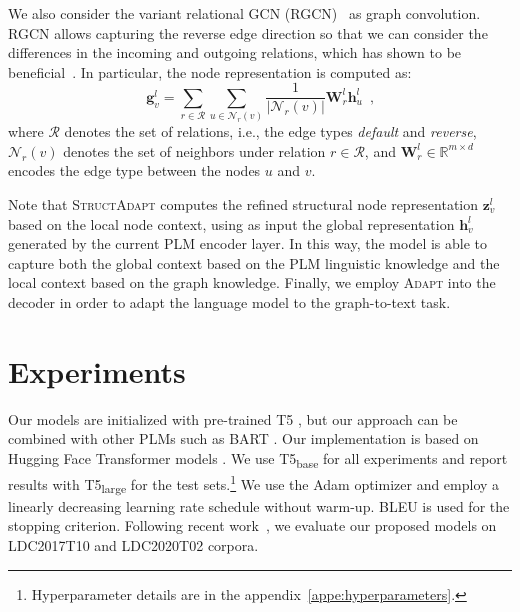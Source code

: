 \documentclass[11pt]{article}
\newcommand{\graphadapter}{{\small\textsc{StructAdapt}}\xspace}
\newcommand{\vanilladapter}{{\small\textsc{Adapt}}\xspace}
\begin{document}
We also consider the variant relational GCN (RGCN)~\cite{Schlichtkrull2018ModelingRD} as graph convolution. RGCN allows capturing the reverse edge direction so that we can consider the differences in the incoming and outgoing relations, which has shown to be beneficial~\cite{beck-etal-2018-graph}. In particular, the node representation is computed as:
\begin{equation}
        \mathbf{g}^{l}_{v} =
        \sum_{r \in \mathcal{R}} 
        \sum_{u \in \mathcal{N}_r(v)}   
        \frac{1}{|\mathcal{N}_r(v)|}
        \mathbf{W}^{l}_r \mathbf{h}^{l}_u  \, \,\,\text{,}
\label{eq:3}
\end{equation}
where $\mathcal{R}$ denotes the set of relations, i.e., the edge types \emph{default} and \emph{reverse}, $\mathcal{N}_r(v)$ denotes the set of neighbors under relation $r \in \mathcal{R}$, and $\mathbf{W}^{l}_{r} \in \mathbb{R}^{m \times d}$ encodes the edge type between the nodes $u$ and $v$. 


Note that \graphadapter computes the refined structural node representation $\mathbf{z}^{l}_v$ based on the local node context, using as input the global representation $\mathbf{h}^{l}_v$ generated by the current PLM encoder layer. In this way, the model is able to capture both the global context based on the PLM linguistic knowledge and the local context based on the graph knowledge. Finally, we employ \vanilladapter into the decoder in order to adapt the language model to the graph-to-text task.
 


\section{Experiments}
\label{sec:exps}

Our models are initialized with pre-trained T5 \hbox{\cite{2019t5}}, but our approach can be combined with other PLMs such as BART \cite{lewis2019bart}. Our implementation is based on Hugging Face Transformer models \citep{wolf2019huggingfaces}. We use T5\textsubscript{base} for all experiments and report results with T5\textsubscript{large} for the test sets.\footnote{Hyperparameter details are in the appendix~\ref{appe:hyperparameters}.} We use the Adam optimizer \cite{kingma:adam} and employ a linearly decreasing learning rate schedule without warm-up. BLEU is used for the stopping criterion. Following recent work~\cite{mager2020gpttoo,zhang-etal-2020-lightweight}, we evaluate our proposed models on LDC2017T10 and LDC2020T02 corpora. 
\end{document}
